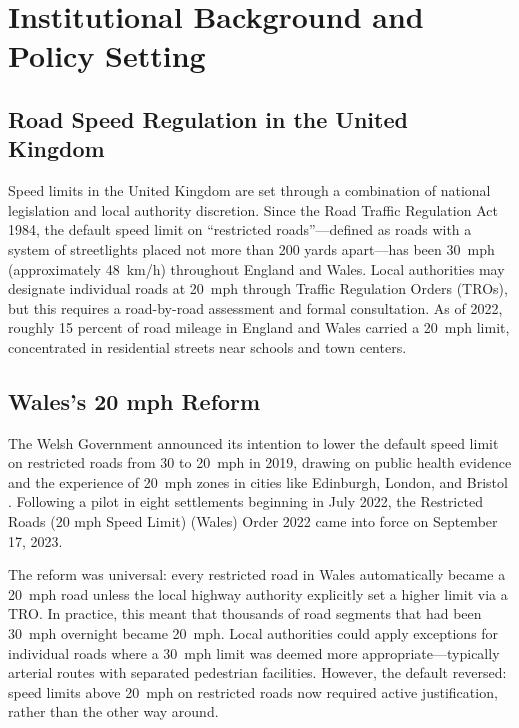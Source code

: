 \documentclass[12pt]{article}
\begin{document}
\section{Institutional Background and Policy Setting}
\label{sec:background}

\subsection{Road Speed Regulation in the United Kingdom}

Speed limits in the United Kingdom are set through a combination of national legislation and local authority discretion. Since the Road Traffic Regulation Act 1984, the default speed limit on ``restricted roads''---defined as roads with a system of streetlights placed not more than 200 yards apart---has been 30~mph (approximately 48~km/h) throughout England and Wales. Local authorities may designate individual roads at 20~mph through Traffic Regulation Orders (TROs), but this requires a road-by-road assessment and formal consultation. As of 2022, roughly 15 percent of road mileage in England and Wales carried a 20~mph limit, concentrated in residential streets near schools and town centers.

\subsection{Wales's 20 mph Reform}

The Welsh Government announced its intention to lower the default speed limit on restricted roads from 30 to 20~mph in 2019, drawing on public health evidence and the experience of 20~mph zones in cities like Edinburgh, London, and Bristol \citep{grundy2009}. Following a pilot in eight settlements beginning in July 2022, the Restricted Roads (20 mph Speed Limit) (Wales) Order 2022 came into force on September 17, 2023.

The reform was universal: every restricted road in Wales automatically became a 20~mph road unless the local highway authority explicitly set a higher limit via a TRO. In practice, this meant that thousands of road segments that had been 30~mph overnight became 20~mph. Local authorities could apply exceptions for individual roads where a 30~mph limit was deemed more appropriate---typically arterial routes with separated pedestrian facilities. However, the default reversed: speed limits above 20~mph on restricted roads now required active justification, rather than the other way around.
\end{document}

